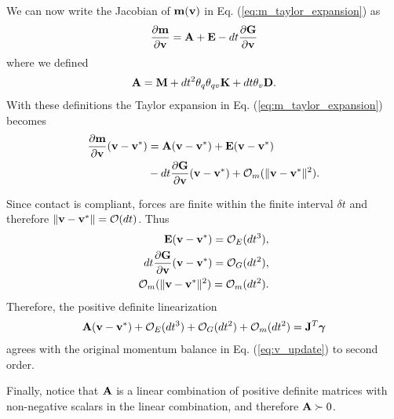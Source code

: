 We can now write the Jacobian of ${\mathbf{m}}({\mathbf{v}})$ in Eq.
(\ref{eq:m_taylor_expansion}) as
\begin{align*}
	\frac{\partial {\mathbf{m}}}{\partial {\mathbf{v}}} = {\mathbf{A}} + {\mathbf{E}} - dt\frac{\partial {\mathbf{G}}}{\partial {\mathbf{v}}}
\end{align*}
where we defined
\begin{align*}
	{\mathbf{A}}={\mathbf{M}}+ dt^2\theta_q\theta_{qv}{\mathbf{K}}+dt\theta_v{\mathbf{D}}.
\end{align*}
With these definitions the Taylor expansion in Eq. (\ref{eq:m_taylor_expansion})
becomes
\begin{align*}
	\frac{\partial{\mathbf{m}}}{\partial{\mathbf{v}}}({\mathbf{v}}-{\mathbf{v}}^*) &= {\mathbf{A}}({\mathbf{v}}-{\mathbf{v}}^*) + {\mathbf{E}}({\mathbf{v}}-{\mathbf{v}}^*) \\
	&- dt\frac{\partial{\mathbf{G}}}{\partial{\mathbf{v}}}({\mathbf{v}}-{\mathbf{v}}^*) + \mathcal{O}_m(\Vert{\mathbf{v}}-{\mathbf{v}}^*\Vert^2).
\end{align*}

Since contact is compliant, forces are finite within the finite interval $\delta
t$ and therefore $\Vert{\mathbf{v}}-{\mathbf{v}}^*\Vert=\mathcal{O}(dt)$. Thus
\begin{align*}
	{\mathbf{E}}({\mathbf{v}}-{\mathbf{v}}^*)=\mathcal{O}_E(dt^3), \\
    dt\frac{\partial {\mathbf{G}}}{\partial {\mathbf{v}}}({\mathbf{v}}-{\mathbf{v}}^*)=\mathcal{O}_G(dt^2), \\ 
    \mathcal{O}_m(\Vert{\mathbf{v}}-{\mathbf{v}}^*\Vert^2) = \mathcal{O}_m(dt^2).
\end{align*}
Therefore, the positive definite linearization
\begin{align*}
	{\mathbf{A}}({\mathbf{v}}-{\mathbf{v}}^*) + \mathcal{O}_E(dt^3) + \mathcal{O}_G(dt^2) +
	\mathcal{O}_m(dt^2) = {\mathbf{J}}^T{\mathbf{{\bm\gamma}}}
\end{align*}
agrees with the original momentum balance in Eq. (\ref{eq:v_update}) to second
order.

Finally, notice that ${\mathbf{A}}$ is a linear combination of positive definite
matrices with non-negative scalars in the linear combination, and therefore
${\mathbf{A}}\succ 0$.\hfill\IEEEQED
